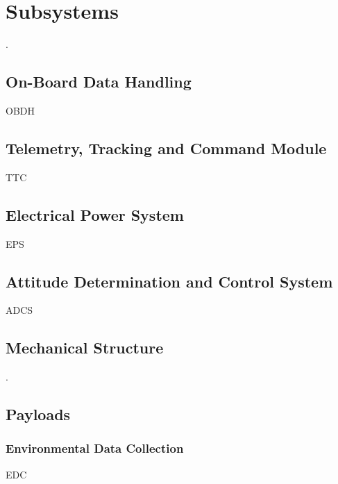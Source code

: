 %
%
%
%
%

%
%
%
%
%
%

\chapter{Subsystems} \label{ch:subsystems}

.

\section{On-Board Data Handling}

OBDH \cite{obdh2}

\section{Telemetry, Tracking and Command Module}

TTC

\section{Electrical Power System}

EPS

\section{Attitude Determination and Control System}

ADCS

\section{Mechanical Structure}

.

\section{Payloads}

\subsection{Environmental Data Collection}

EDC \cite{edc}
